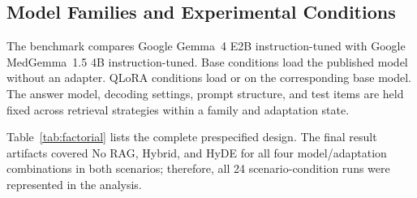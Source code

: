 \subsection{Model Families and Experimental Conditions}
The benchmark compares Google Gemma~4 E2B instruction-tuned with Google
MedGemma~1.5 4B instruction-tuned. Base conditions load the published
model without an adapter. QLoRA conditions load
 or
 on the corresponding base
model. The answer model, decoding settings, prompt structure, and test
items are held fixed across retrieval strategies within a family and
adaptation state.

Table~\ref{tab:factorial} lists the complete prespecified design. The final
result artifacts covered No RAG, Hybrid, and HyDE for all four
model/adaptation combinations in both scenarios; therefore, all 24
scenario-condition runs were represented in the analysis.

